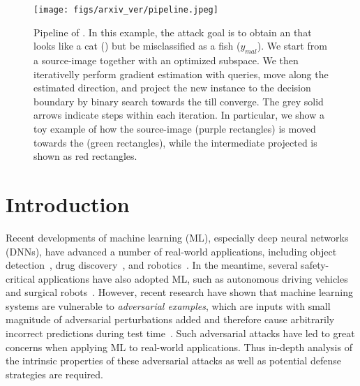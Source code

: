\begin{figure*}[htbp]
    \centering
    \texttt{[image: figs/arxiv\_ver/pipeline.jpeg]}
    \caption{Pipeline of \name. In this example, the attack goal is to obtain an \advimage that looks like a cat (\targetimage) but be misclassified as a fish ($y_{mal}$). We start from a source-image together with an optimized subspace. We then iterativelly perform gradient estimation with queries, move along the estimated direction, and project the new instance to the decision boundary by binary search towards the \targetimage till converge. The grey solid arrows indicate steps within each iteration. 
    In particular, we show a toy example of how the source-image (purple rectangles) is moved towards the \targetimage (green rectangles), while the intermediate projected \boundaryimage is shown as red rectangles.}
    \label{fig:pipeline}
\end{figure*}

\section{Introduction}

Recent developments of machine learning (ML), especially deep neural networks (DNNs), have advanced a number of real-world applications, including object detection~\cite{ren2015faster}, drug discovery~\cite{chen2018rise}, and robotics~\cite{lenz2015deep}. In the meantime, several safety-critical applications have also adopted ML, such as autonomous driving vehicles~\cite{chen2015deepdriving} and surgical robots~\cite{richter2019open,mlsurgicalrobotics}.
However, recent research have shown that machine learning systems are vulnerable to \emph{adversarial examples}, which are inputs with small magnitude of adversarial perturbations added and therefore cause arbitrarily incorrect predictions during test time~\cite{eykholt2017robust,xiao2018generating,carlini2017towards,goodfellow2014explaining,chaowei2018characterizing,chaowei2018spatially}.
Such adversarial attacks have led to great concerns when applying ML to real-world applications. Thus in-depth analysis of the intrinsic properties of these adversarial attacks as well as potential defense strategies are required.

